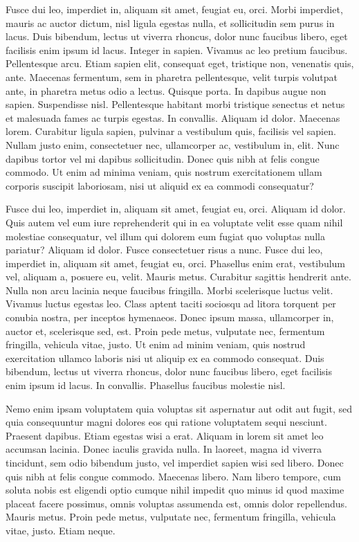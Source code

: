 Fusce dui leo, imperdiet in, aliquam sit amet, feugiat eu, orci. Morbi imperdiet, mauris ac auctor dictum, nisl ligula egestas nulla, et sollicitudin sem purus in lacus. Duis bibendum, lectus ut viverra rhoncus, dolor nunc faucibus libero, eget facilisis enim ipsum id lacus. Integer in sapien. Vivamus ac leo pretium faucibus. Pellentesque arcu. Etiam sapien elit, consequat eget, tristique non, venenatis quis, ante. Maecenas fermentum, sem in pharetra pellentesque, velit turpis volutpat ante, in pharetra metus odio a lectus. Quisque porta. In dapibus augue non sapien. Suspendisse nisl. Pellentesque habitant morbi tristique senectus et netus et malesuada fames ac turpis egestas. In convallis. Aliquam id dolor. Maecenas lorem. Curabitur ligula sapien, pulvinar a vestibulum quis, facilisis vel sapien. Nullam justo enim, consectetuer nec, ullamcorper ac, vestibulum in, elit. Nunc dapibus tortor vel mi dapibus sollicitudin. Donec quis nibh at felis congue commodo. Ut enim ad minima veniam, quis nostrum exercitationem ullam corporis suscipit laboriosam, nisi ut aliquid ex ea commodi consequatur?

Fusce dui leo, imperdiet in, aliquam sit amet, feugiat eu, orci. Aliquam id dolor. Quis autem vel eum iure reprehenderit qui in ea voluptate velit esse quam nihil molestiae consequatur, vel illum qui dolorem eum fugiat quo voluptas nulla pariatur? Aliquam id dolor. Fusce consectetuer risus a nunc. Fusce dui leo, imperdiet in, aliquam sit amet, feugiat eu, orci. Phasellus enim erat, vestibulum vel, aliquam a, posuere eu, velit. Mauris metus. Curabitur sagittis hendrerit ante. Nulla non arcu lacinia neque faucibus fringilla. Morbi scelerisque luctus velit. Vivamus luctus egestas leo. Class aptent taciti sociosqu ad litora torquent per conubia nostra, per inceptos hymenaeos. Donec ipsum massa, ullamcorper in, auctor et, scelerisque sed, est. Proin pede metus, vulputate nec, fermentum fringilla, vehicula vitae, justo. Ut enim ad minim veniam, quis nostrud exercitation ullamco laboris nisi ut aliquip ex ea commodo consequat. Duis bibendum, lectus ut viverra rhoncus, dolor nunc faucibus libero, eget facilisis enim ipsum id lacus. In convallis. Phasellus faucibus molestie nisl.

Nemo enim ipsam voluptatem quia voluptas sit aspernatur aut odit aut fugit, sed quia consequuntur magni dolores eos qui ratione voluptatem sequi nesciunt. Praesent dapibus. Etiam egestas wisi a erat. Aliquam in lorem sit amet leo accumsan lacinia. Donec iaculis gravida nulla. In laoreet, magna id viverra tincidunt, sem odio bibendum justo, vel imperdiet sapien wisi sed libero. Donec quis nibh at felis congue commodo. Maecenas libero. Nam libero tempore, cum soluta nobis est eligendi optio cumque nihil impedit quo minus id quod maxime placeat facere possimus, omnis voluptas assumenda est, omnis dolor repellendus. Mauris metus. Proin pede metus, vulputate nec, fermentum fringilla, vehicula vitae, justo. Etiam neque.

